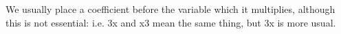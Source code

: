 We usually place a coefficient before the variable which it multiplies,
although this is not essential: i.e. 3x and x3 mean the same thing, but
3x is more usual.